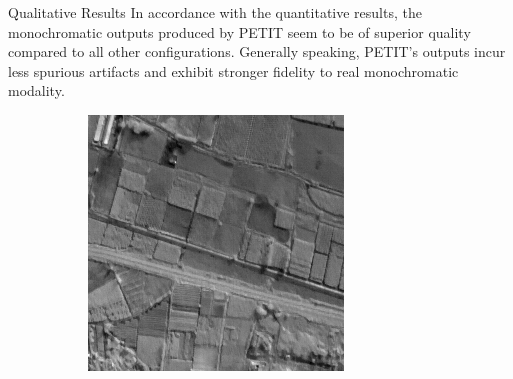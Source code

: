 \documentclass[final]{beamer}
\newlength{\colwidth}
\begin{document}
\begin{frame}[t]
\begin{columns}[t]
\begin{column}{\colwidth}
  \begin{block}{Qualitative Results}
    In accordance with the quantitative results, the monochromatic outputs produced by PETIT seem to be of superior quality compared to all other configurations.
    Generally speaking, PETIT's outputs incur less spurious artifacts and exhibit stronger fidelity to real monochromatic modality.
      \begin{figure}
        \centering
        \begin{subfigure}[b]{0.19\textwidth}
            \centering
            \includegraphics[width=\textwidth]{../figs/outputs/pan/71.png}
        \end{subfigure}
        \hfill
        \begin{subfigure}[b]{0.19\textwidth}
            \centering

\end{subfigure}
\end{figure}
\end{block}
\end{column}
\end{columns}
\end{frame}
\end{document}
